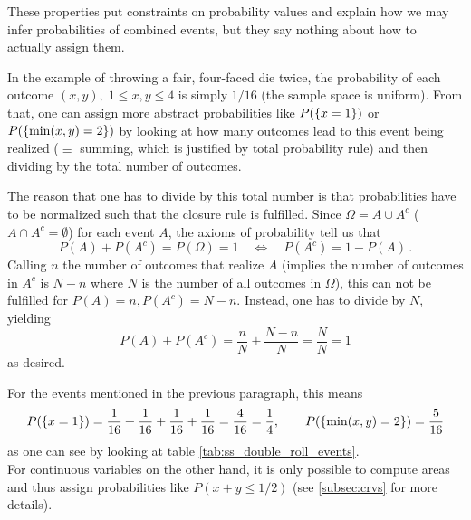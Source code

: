 These properties put constraints on probability values and explain how we may infer probabilities of combined events, but they say nothing about how to actually assign them.

\begin{ex}
In the example of throwing a fair, four-faced die twice, the probability of each outcome $(x, y), \; 1 \leq x, y \leq 4$ is simply $1 / 16$ (the sample space is uniform). From that, one can assign more abstract probabilities like $P(\qty{x = 1})$ or $P(\qty{\min(x, y) = 2})$ by looking at how many outcomes lead to this event being realized ($\equiv$ summing, which is justified by total probability rule) and then dividing by the total number of outcomes.

The reason that one has to divide by this total number is that probabilities have to be normalized such that the closure rule is fulfilled. Since $\Omega = A \cup A^c$ ($A \cap A^c = \emptyset$) for each event $A$, the axioms of probability tell us that
\begin{equation}
P(A) + P(A^c) = P(\Omega) = 1 \quad \Leftrightarrow \quad P(A^c) = 1 - P(A) \, .
\end{equation}
Calling $n$ the number of outcomes that realize $A$ (implies the number of outcomes in $A^c$ is $N - n$ where $N$ is the number of all outcomes in $\Omega$), this can not be fulfilled for $P(A) = n, P(A^c) = N - n$. Instead, one has to divide by $N$, yielding
\begin{equation*}
P(A) + P(A^c) = \frac{n}{N} + \frac{N - n}{N} = \frac{N}{N} = 1
\end{equation*}
as desired.


For the events mentioned in the previous paragraph, this means
\begin{equation*}
P(\qty{x = 1}) = \frac{1}{16} + \frac{1}{16} + \frac{1}{16} + \frac{1}{16} = \frac{4}{16} = \frac{1}{4}, \qquad P(\qty{\min(x, y) = 2}) = \frac{5}{16}
\end{equation*}
as one can see by looking at table \ref{tab:ss_double_roll_events}.\\


For continuous variables on the other hand, it is only possible to compute areas and thus assign probabilities like $P(x + y \leq 1/ 2)$ (see \ref{subsec:crvs} for more details).
\end{ex}


